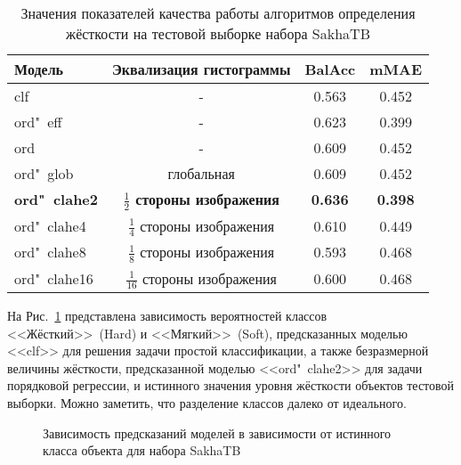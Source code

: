 \begin{table} [htbp]%
	\centering
	\caption{Значения показателей качества работы алгоритмов определения жёсткости на тестовой выборке набора SakhaTB}%
	\label{tab:hardness-metrics-test}%
	\renewcommand{\arraystretch}{1.5}%
	\begin{SingleSpace}
		\begin{tabular}{@{}@{\extracolsep{20pt}}lccc@{}} %
			\toprule     %
			Модель & Эквализация гистограммы & BalAcc & mMAE \\
			\midrule %
			clf	& - & 0.563 & 0.452 \\
			ord"~eff & - & 0.623 & 0.399 \\
			ord & - & 0.609 & 0.452 \\
			ord"~glob & глобальная & 0.609 & 0.452 \\
			\textbf{ord"~clahe2} & \textbf{$\frac{1}{2}$ стороны изображения} & \textbf{0.636} & \textbf{0.398} \\
			ord"~clahe4 & $\frac{1}{4}$ стороны изображения	& 0.610 & 0.449 \\
			ord"~clahe8 & $\frac{1}{8}$ стороны изображения	& 0.593 & 0.468 \\
			ord"~clahe16 & $\frac{1}{16}$ стороны изображения & 0.600 & 0.468 \\
			\bottomrule %
		\end{tabular}%
	\end{SingleSpace}
\end{table}

На Рис.~\ref{fig:hardness-class-separation} представлена зависимость вероятностей классов <<Жёсткий>>~(Hard) и <<Мягкий>>~(Soft), предсказанных моделью <<clf>> для решения задачи простой классификации, а также безразмерной величины жёсткости, предсказанной моделью <<ord"~clahe2>> для задачи порядковой регрессии, и истинного значения уровня жёсткости объектов тестовой выборки. Можно заметить, что разделение классов далеко от идеального.

\begin{figure}[ht]
	\caption{Зависимость предсказаний моделей в зависимости от истинного класса объекта для набора SakhaTB}
	\label{fig:hardness-class-separation}
\end{figure}


